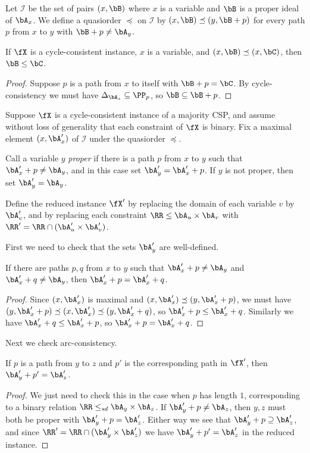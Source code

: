 \begin{defn} Let $\mathcal{I}$ be the set of pairs $(x,\bB)$ where $x$ is a variable and $\bB$ is a proper ideal of $\bA_x$. We define a quasiorder $\preceq$ on $\mathcal{I}$ by $(x,\bB) \preceq (y, \bB+p)$ for every path $p$ from $x$ to $y$ with $\bB + p \ne \bA_y$.
\end{defn}

\begin{prop} If $\fX$ is a cycle-consistent instance, $x$ is a variable, and $(x,\bB) \preceq (x, \bC)$, then $\bB \le \bC$.
\end{prop}
\begin{proof} Suppose $p$ is a path from $x$ to itself with $\bB + p = \bC$. By cycle-consistency we must have $\Delta_{\bA_x} \subseteq \PP_p$, so $\bB \subseteq \bB + p$.
\end{proof}

\begin{defn} Suppose $\fX$ is a cycle-consistent instance of a majority CSP, and assume without loss of generality that each constraint of $\fX$ is binary. Fix a maximal element $(x,\bA_x')$ of $\mathcal{I}$ under the quasiorder $\preceq$.

Call a variable $y$ \emph{proper} if there is a path $p$ from $x$ to $y$ such that $\bA_x' + p \ne \bA_y$, and in this case set $\bA_y' = \bA_x' + p$. If $y$ is not proper, then set $\bA_y' = \bA_y$.

Define the reduced instance $\fX'$ by replacing the domain of each variable $v$ by $\bA_v'$, and by replacing each constraint $\RR \le \bA_u \times \bA_v$ with $\RR' = \RR \cap (\bA_u' \times \bA_v')$.
\end{defn}

First we need to check that the sets $\bA_y'$ are well-defined.

\begin{lem} If there are paths $p,q$ from $x$ to $y$ such that $\bA_x' + p \ne \bA_y$ and $\bA_x' + q \ne \bA_y$, then $\bA_x' + p = \bA_x' + q$.
\end{lem}
\begin{proof} Since $(x,\bA_x')$ is maximal and $(x,\bA_x') \preceq (y, \bA_x' + p)$, we must have $(y, \bA_x' + p) \preceq (x,\bA_x') \preceq (y, \bA_x' + q)$, so $\bA_x' + p \le \bA_x' + q$. Similarly we have $\bA_x' + q \le \bA_x' + p$, so $\bA_x' + p = \bA_x' + q$.
\end{proof}

Next we check arc-consistency.

\begin{lem} If $p$ is a path from $y$ to $z$ and $p'$ is the corresponding path in $\fX'$, then $\bA_y' + p' = \bA_z'$.
\end{lem}
\begin{proof} We just need to check this in the case when $p$ has length $1$, corresponding to a binary relation $\RR \le_{sd} \bA_y \times \bA_z$. If $\bA_y' + p \ne \bA_z$, then $y,z$ must both be proper with $\bA_y' + p = \bA_z'$. Either way we see that $\bA_y' + p \supseteq \bA_z'$, and since $\RR' = \RR \cap (\bA_y' \times \bA_z')$ we have $\bA_y' + p' = \bA_z'$ in the reduced instance.
\end{proof}

